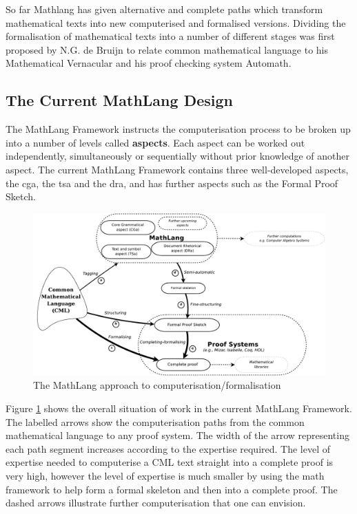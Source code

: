 So far Mathlang has given alternative and complete paths which transform mathematical texts into new computerised and formalised versions. Dividing the formalisation of mathematical texts into a number of different stages was first proposed by N.G. de Bruijn to relate common mathematical language to his Mathematical Vernacular \cite{mv} and his proof checking system Automath.

\subsection{The Current MathLang Design \label{sec:currentmath}}
The MathLang Framework instructs the computerisation process to be broken up into a number of levels called \textbf{aspects}. Each aspect can be worked out independently, simultaneously or sequentially without prior knowledge of another aspect. The current MathLang Framework contains three well-developed aspects, the \gls{cga}, the \gls{tsa} and the \gls{dra}, and has further aspects such as the Formal Proof Sketch.

\begin{figure}[H]
\begin{center}
\includegraphics[scale=0.255]{Figures/Background/mathlang.png}
\end{center}
\caption{The MathLang approach to computerisation/formalisation \cite{mathintomizar}\label{fig:mathlang}}
\end{figure}

Figure \ref{fig:mathlang} shows the overall situation of work in the current MathLang Framework.
The labelled arrows show the computerisation paths from the common mathematical language to any proof system. The width of the arrow representing each path segment increases according to the expertise required. The level of expertise needed to computerise a CML text straight into a complete proof is very high, however the level of expertise is much smaller by using the \gls{math} framework to help form a formal skeleton and then into a complete proof. The dashed arrows illustrate further computerisation that one can envision.

